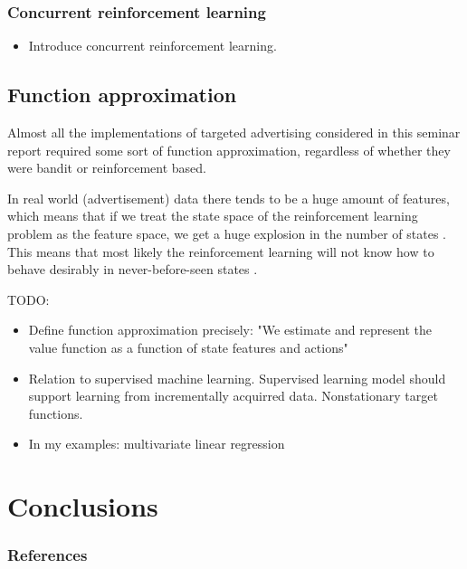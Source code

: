 \documentclass{article} %
\begin{document}
\subsubsection{Concurrent reinforcement learning}

\begin{itemize}
  \item{Introduce concurrent reinforcement learning.}
\end{itemize}


\subsection{Function approximation}
\label{sec:function_approximation}
Almost all the implementations \cite{abe2002empirical, silver2013concurrent,
chapelle2011empirical} of targeted advertising considered in this seminar
report required some sort of function approximation, regardless of whether they
were bandit or reinforcement based.

In real world (advertisement) data there tends to be a huge amount of features,
which means that if we treat the state space of the reinforcement learning
problem as the feature space, we get a huge explosion in the number of states
\cite{abe2002empirical}.  This means that most likely the reinforcement
learning will not know how to behave desirably in never-before-seen states
\cite{book}.

TODO:
\begin{itemize}
  \item{Define function approximation precisely: "We estimate and represent the
    value function as a function of state features and actions"}
  \item{Relation to supervised machine learning. Supervised learning model
    should support learning from incrementally acquirred data. Nonstationary
  target functions.}
  \item{In my examples: multivariate linear regression}
\end{itemize}


\section{Conclusions}

\subsubsection*{References}

\printbibliography[heading=none]
\end{document}
